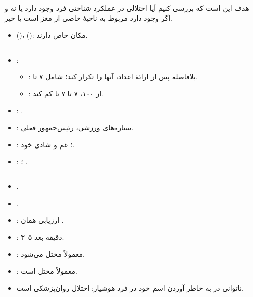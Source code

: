 \documentclass[a4paper,12pt]{extbook}
\begin{document}
\subsection*{}
هدف این است که بررسی کنیم آیا اختلالی در عملکرد شناختی فرد وجود دارد یا نه و اگر وجود دارد مربوط به ناحیهٔ خاصی از مغز است یا خیر.
\begin{itemize}
\item {} ()،  (): مکان خاص دارند.
\end{itemize}
\subsection*{}
\begin{itemize}
\item {}:
  \begin{itemize}
  \item {}: بلا‌فاصله پس از ارائهٔ اعداد، آنها را تکرار کند؛ شامل ۷ تا.
  \item {}: از ۱۰۰، ۷ تا ۷ تا کم کند.
  \end{itemize}
\item {}: .
\item {}: ستاره‌های ورزشی، رئیس‌جمهور فعلی.
\item {}: ؛ غم و شادی خود.
\item {}: ؛ .
\end{itemize}
\subsection*{}
\begin{itemize}
\item {}.
\item {}.
\item {}: ارزیابی همان .
\item {}: ۳–۵ دقیقه بعد.
\item {}: معمولاً  مختل می‌شود.
\item {}: معمولاً  مختل است.
\item ناتوانی در به خاطر آوردن اسم خود در فرد هوشیار: اختلال روان‌پزشکی است.
\end{itemize}
\end{document}
